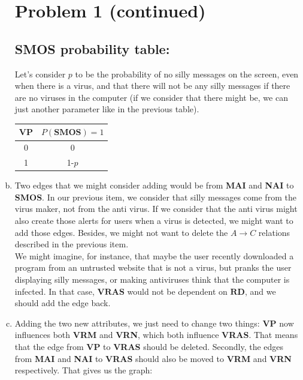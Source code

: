 \documentclass{article}
\begin{document}
\begin{enumerate}[(a)]
\begin{center}
\begin{tabular}{|c|c|}
                    \end{tabular}
                \end{center}

                \newpage
        \section*{Problem 1 (continued)}
                \subsection*{SMOS probability table:}
                Let's consider $p$ to be the probability of no silly messages on the screen, even when there is a virus, and that there will not be any silly messages if there are no viruses in the computer (if we consider that there might be, we can just another parameter like in the previous table). 
                \begin{center}
                   \begin{tabular}{|c|c|} \hline
                        \textbf{VP} & $P(\textbf{SMOS})=1$  \\ \hline
                        0 & 0 \\ \hline
                        1 & 1-$p$\\ \hline
                        
                    \end{tabular}
                \end{center}
            \item
                Two edges that we might consider adding would be from \textbf{MAI} and \textbf{NAI} to \textbf{SMOS}. In our previous item, we consider that silly messages come from the virus maker, not from the anti virus. If we consider that the anti virus might also create those alerts for users when a virus is detected, we might want to add those edges. Besides, we might not want to delete the $A\rightarrow  C$ relations described in the previous item.\\

                We might imagine, for instance, that maybe the user recently downloaded a program from an untrusted website that is not a virus, but pranks the user displaying silly messages, or making antiviruses think that the computer is infected. In that case, $\textbf{VRAS}$ would not be dependent on $\textbf{RD}$, and we should add the edge back.
            \item
                Adding the two new attributes, we just need to change two things: \textbf{VP} now influences both \textbf{VRM} and \textbf{VRN}, which both influence \textbf{VRAS}. That means that the edge from \textbf{VP} to \textbf{VRAS} should be deleted. Secondly, the edges from \textbf{MAI} and \textbf{NAI} to \textbf{VRAS} should also be moved to \textbf{VRM} and \textbf{VRN} respectively. That gives us the graph:
                

\end{enumerate}
\end{document}
